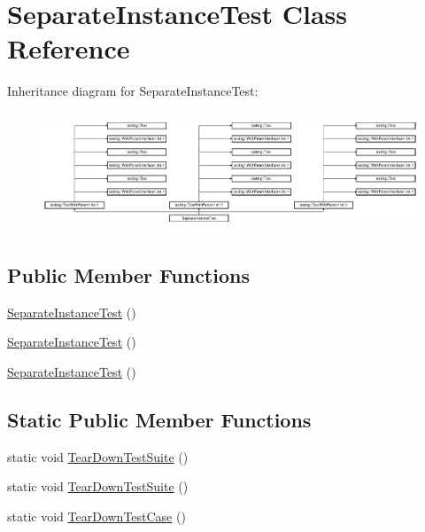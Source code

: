 \hypertarget{class_separate_instance_test}{}\section{Separate\+Instance\+Test Class Reference}
\label{class_separate_instance_test}
Inheritance diagram for Separate\+Instance\+Test\+:\begin{figure}[H]
\begin{center}
\leavevmode
\includegraphics[height=3.572568cm]{d7/dd4/class_separate_instance_test}
\end{center}
\end{figure}
\subsection*{Public Member Functions}
\begin{DoxyCompactItemize}
\item 
\mbox{\hyperlink{class_separate_instance_test_a50a822b67bbc10d44701d213c2849b09}{Separate\+Instance\+Test}} ()
\item 
\mbox{\hyperlink{class_separate_instance_test_a50a822b67bbc10d44701d213c2849b09}{Separate\+Instance\+Test}} ()
\item 
\mbox{\hyperlink{class_separate_instance_test_a50a822b67bbc10d44701d213c2849b09}{Separate\+Instance\+Test}} ()
\end{DoxyCompactItemize}
\subsection*{Static Public Member Functions}
\begin{DoxyCompactItemize}
\item 
static void \mbox{\hyperlink{class_separate_instance_test_a9ec93e237dd1f2a77dae1081ab651888}{Tear\+Down\+Test\+Suite}} ()
\item 
static void \mbox{\hyperlink{class_separate_instance_test_a9ec93e237dd1f2a77dae1081ab651888}{Tear\+Down\+Test\+Suite}} ()
\item 
static void \mbox{\hyperlink{class_separate_instance_test_a7c4a72843a7c4a9be56adef27ecd33c7}{Tear\+Down\+Test\+Case}} ()
\end{DoxyCompactItemize}
